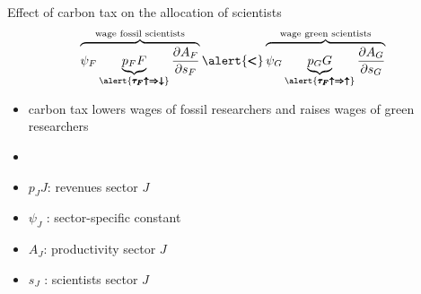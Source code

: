 \documentclass[11pt,aspectratio=169]{beamer}
\begin{document}
\addtocounter{framenumber}{-1}

\begin{frame}{Effect of carbon tax on the allocation of scientists}
	\vspace{2mm}
	\begin{align*}
		\overbrace{{\psi_F} \underbrace{p_F{F}}_{\alert{\pmb{\tau_F\uparrow\Rightarrow\downarrow}}}\frac{\partial A_{F}}{\partial s_{F}}}^{\text{wage fossil scientists}}\alert{\pmb{<}}\overbrace{{\psi_G} \underbrace{p_G{G}}_{\alert{\pmb{\tau_F\uparrow\Rightarrow\uparrow}}}\frac{\partial A_{G}}{\partial s_{G}}}^{\text{wage green scientists}}
	\end{align*}
	\normalsize
	\begin{itemize}
		\item carbon tax lowers wages of fossil researchers and raises wages of green researchers
		\vspace{2mm}
		\item[]%
	\end{itemize}
	\small
	\vspace{4mm}
	\hspace{-2mm}
	\begin{minipage}[t!]{0.4\textwidth}
		\vspace{0mm}
		\begin{itemize}
			\item[] $p_JJ$: revenues sector $J$
			\vspace{-2mm}
			\item[] $\psi_J$ : sector-specific constant
		\end{itemize}
	\end{minipage}
	\vspace{-5mm}
	\begin{minipage}[t!]{0.5\textwidth}
		\vspace{0mm}
		\begin{itemize}	
			\item[] $A_J$: productivity sector $J$
			\vspace{-2mm}			
			\item[] $s_J$ : scientists sector $J$
		\end{itemize}
	\end{minipage}
\end{frame}

\addtocounter{framenumber}{-1}
\end{document}
